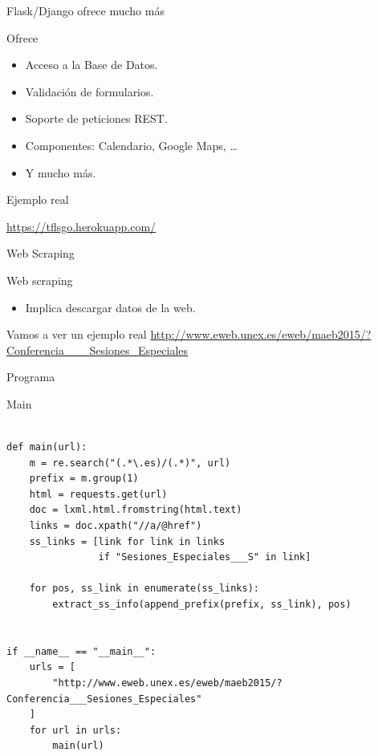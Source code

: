 \documentclass[bigger,unknownkeysallowed]{beamer}
\begin{document}
\begin{frame}[label={sec:orgd93160e}]{Flask/Django ofrece mucho más}
\begin{block}{Ofrece}
\begin{itemize}
\item Acceso a la Base de Datos.
\item Validación de formularios.
\item Soporte de peticiones REST.
\item Componentes: Calendario, Google Maps, \ldots{}
\item Y mucho más.
\end{itemize}
\end{block}

\begin{block}{Ejemplo real}
\begin{center}
{\color{blue}\href{https://tflsgo.herokuapp.com/}{https://tflsgo.herokuapp.com/}}
\end{center}
\end{block}
\end{frame}

\begin{frame}[label={sec:org578e073}]{Web Scraping}
\begin{block}{Web scraping}
\begin{itemize}
\item Implica descargar datos de la web.
\end{itemize}
\end{block}

\begin{block}{Vamos a ver un ejemplo real}
\url{http://www.eweb.unex.es/eweb/maeb2015/?Conferencia\_\_\_Sesiones\_Especiales}
\end{block}
\end{frame}

\begin{frame}[fragile,label={sec:org6c48712}]{Programa}
 \begin{exampleblock}{Main}
\lstset{language=Python,label= ,caption= ,captionpos=b,numbers=none}
\begin{lstlisting}

def main(url):
    m = re.search("(.*\.es)/(.*)", url)
    prefix = m.group(1)
    html = requests.get(url)
    doc = lxml.html.fromstring(html.text)
    links = doc.xpath("//a/@href")
    ss_links = [link for link in links 
                if "Sesiones_Especiales___S" in link]

    for pos, ss_link in enumerate(ss_links):
        extract_ss_info(append_prefix(prefix, ss_link), pos)


if __name__ == "__main__":
    urls = [
        "http://www.eweb.unex.es/eweb/maeb2015/?Conferencia___Sesiones_Especiales"
    ]
    for url in urls:
        main(url)
\end{lstlisting}
\end{exampleblock}
\end{frame}
\end{document}
